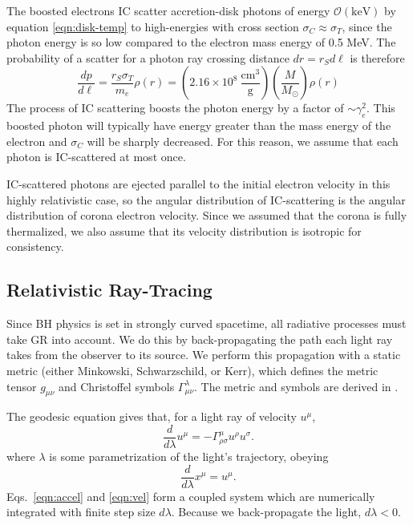 \documentclass[twocolumn,twocolappendix]{aastex631}
\newcommand{\parens}[1]{\left(#1\right)}
\begin{document}
The boosted electrons IC scatter accretion-disk photons of energy $\mathcal{O}(\text{keV})$ by equation \ref{eqn:disk-temp} to high-energies with cross section $\sigma_C\approx \sigma_T$, since the photon energy is so low compared to the electron mass energy of 0.5 MeV. The probability of a scatter for a photon ray crossing distance $dr = r_S d\ell$ is therefore
\begin{equation}
  \frac{dp}{d\ell} = \frac{r_S \sigma_T}{m_e} \rho(r) = \parens{2.16 \times 10^8\ \frac{\text{cm}^3}{\text{g}}}\parens{\frac{M}{M_\odot}}\rho(r)
\end{equation}
The process of IC scattering boosts the photon energy by a factor of $\sim\gamma_e^2$. This boosted photon will typically have energy greater than the mass energy of the electron and $\sigma_C$ will be sharply decreased. For this reason, we assume that each photon is IC-scattered at most once.

IC-scattered photons are ejected parallel to the initial electron velocity in this highly relativistic case, so the angular distribution of IC-scattering is the angular distribution of corona electron velocity. Since we assumed that the corona is fully thermalized, we also assume that its velocity distribution is isotropic for consistency.



\subsection{Relativistic Ray-Tracing}
\label{sec:rendering}

Since BH physics is set in strongly curved spacetime, all radiative processes must take GR into account. We do this by back-propagating the path each light ray takes from the observer to its source. We perform this propagation with a static metric (either Minkowski, Schwarzschild, or Kerr), which defines the metric tensor $g_{\mu \nu}$ and Christoffel symbols $\Gamma_{\mu\nu}^\lambda$. The metric and symbols are derived in \cite{muller2009catalogue}.

The geodesic equation gives that, for a light ray of velocity $u^\mu$,
\begin{equation}
  \frac{d}{d\lambda}u^\mu = -\Gamma^\mu_{\rho \sigma}u^\rho u^\sigma.
  \label{eqn:accel}
\end{equation}
where $\lambda$ is some parametrization of the light's trajectory, obeying 
\begin{equation}
  \frac{d}{d\lambda}x^\mu = u^\mu.
  \label{eqn:vel}
\end{equation}
Eqs.~\ref{eqn:accel} and \ref{eqn:vel} form a coupled system which are numerically integrated with finite step size $d\lambda$. Because we back-propagate the light, $d\lambda < 0$. 
\end{document}
